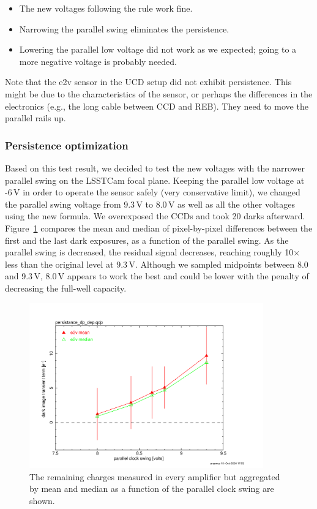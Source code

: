 \begin{itemize}
\tightlist
\item
  The new voltages following the rule work fine.
\item
  Narrowing the parallel swing eliminates the persistence.
\item
  Lowering the parallel low voltage did not work
  as we expected; going to a more negative voltage is probably needed.
\end{itemize}

Note that the e2v sensor in the UCD setup did not exhibit persistence.
This might be due to the characteristics of the sensor, or perhaps
the differences in the electronics (e.g., the long cable between CCD and REB). They need to move the parallel rails up.

\subsubsection{Persistence
optimization}\label{persistence-optimization-1}

Based on this test result, we decided to test the new voltages with
the narrower parallel swing on the LSSTCam focal plane. Keeping the
parallel low voltage at -6\,V in order to operate the sensor safely (very
conservative limit), we changed the parallel swing voltage from 9.3\,V to
8.0\,V as well as all the other voltages using the new formula. We
overexposed the CCDs and took 20 darks afterward. Figure~\ref{fig:peristence-swing} compares the
mean and median of pixel-by-pixel differences between the first and the
last dark exposures, as a function of the parallel swing. As the
parallel swing is decreased, the residual signal decreases, reaching
roughly 10$\times$ less than the original level at 9.3\,V. Although we sampled
midpoints between 8.0 and 9.3\,V, 8.0\,V appears to work the best and could
be lower with the penalty of decreasing the full-well capacity.

\begin{figure}
\begin{centering}
\includegraphics[width=0.9\textwidth]{figures/e2v_transient_dark_vs_dp.png}

\caption{The remaining charges measured in every amplifier but
aggregated by mean and median as a function of the parallel clock swing
are shown.}
\label{fig:peristence-swing}
\end{centering}
\end{figure}


